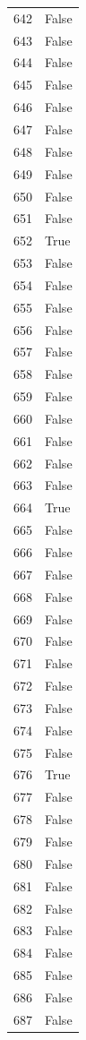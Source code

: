 \documentclass[
  letterpaper,
  DIV=11,
  numbers=noendperiod]{scrreprt}
\begin{document}
\begin{tabular}{ll}
642  &  False \\
643  &  False \\
644  &  False \\
645  &  False \\
646  &  False \\
647  &  False \\
648  &  False \\
649  &  False \\
650  &  False \\
651  &  False \\
652  &   True \\
653  &  False \\
654  &  False \\
655  &  False \\
656  &  False \\
657  &  False \\
658  &  False \\
659  &  False \\
660  &  False \\
661  &  False \\
662  &  False \\
663  &  False \\
664  &   True \\
665  &  False \\
666  &  False \\
667  &  False \\
668  &  False \\
669  &  False \\
670  &  False \\
671  &  False \\
672  &  False \\
673  &  False \\
674  &  False \\
675  &  False \\
676  &   True \\
677  &  False \\
678  &  False \\
679  &  False \\
680  &  False \\
681  &  False \\
682  &  False \\
683  &  False \\
684  &  False \\
685  &  False \\
686  &  False \\
687  &  False \\

\end{tabular}
\end{document}
